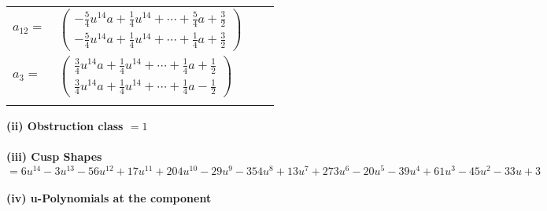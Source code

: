 \documentclass[1p]{elsarticle_modified}
\theoremstyle{definition}
\begin{document}
\begin{tabular}{m{7pt} m{180pt} m{7pt} m{180pt} }
\flushright $a_{12}=$&$\begin{pmatrix}-\frac{5}{4} u^{14} a+\frac{1}{4} u^{14}+\cdots+\frac{5}{4} a+\frac{3}{2}\\-\frac{5}{4} u^{14} a+\frac{1}{4} u^{14}+\cdots+\frac{1}{4} a+\frac{3}{2}\end{pmatrix}$ \\
\flushright $a_{3}=$&$\begin{pmatrix}\frac{3}{4} u^{14} a+\frac{1}{4} u^{14}+\cdots+\frac{1}{4} a+\frac{1}{2}\\\frac{3}{4} u^{14} a+\frac{1}{4} u^{14}+\cdots+\frac{1}{4} a-\frac{1}{2}\end{pmatrix}$\\&\end{tabular}
\flushleft \textbf{(ii) Obstruction class $= 1$}\\~\\
\flushleft \textbf{(iii) Cusp Shapes $= 6 u^{14}-3 u^{13}-56 u^{12}+17 u^{11}+204 u^{10}-29 u^9-354 u^8+13 u^7+273 u^6-20 u^5-39 u^4+61 u^3-45 u^2-33 u+3$}\\~\\
\newpage\renewcommand{\arraystretch}{1}
\flushleft \textbf{(iv) u-Polynomials at the component}\newline \\
\end{document}
